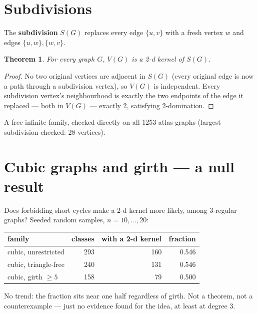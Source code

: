 \documentclass[11pt]{article}
\theoremstyle{plain}
\newtheorem{theorem}{Theorem}
\theoremstyle{definition}
\theoremstyle{remark}
\begin{document}
\section{Subdivisions}

The \textbf{subdivision} $S(G)$ replaces every edge $\{u,v\}$ with a fresh vertex $w$
and edges $\{u,w\},\{w,v\}$.

\begin{theorem}
For every graph $G$, $V(G)$ is a 2-d kernel of $S(G)$.
\end{theorem}

\begin{proof}
No two original vertices are adjacent in $S(G)$ (every original edge is now a path
through a subdivision vertex), so $V(G)$ is independent. Every subdivision vertex's
neighbourhood is exactly the two endpoints of the edge it replaced — both in $V(G)$
— exactly 2, satisfying 2-domination.
\end{proof}

A free infinite family, checked directly on all 1253 atlas graphs (largest
subdivision checked: 28 vertices).

\section{Cubic graphs and girth — a null result}

Does forbidding short cycles make a 2-d kernel more likely, among 3-regular graphs?
Seeded random samples, $n=10,\dots,20$:

\begin{center}
\begin{tabular}{@{}lrrr@{}}
\toprule
family & classes & with a 2-d kernel & fraction \\
\midrule
cubic, unrestricted & 293 & 160 & 0.546 \\
cubic, triangle-free & 240 & 131 & 0.546 \\
cubic, girth $\ge5$ & 158 & 79 & 0.500 \\
\bottomrule
\end{tabular}
\end{center}

No trend: the fraction sits near one half regardless of girth. Not a theorem, not a
counterexample — just no evidence found for the idea, at least at degree 3.
\end{document}
